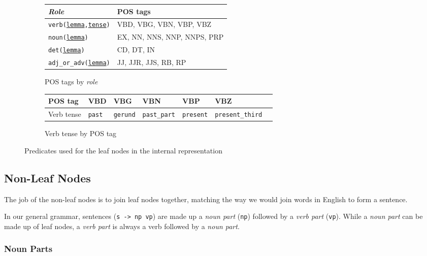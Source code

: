 \begin{figure}[H]
\begin{subfigure}{\textwidth}
\centering
\begin{tabular}{@{}ll@{}}
\toprule
\textit{Role}         & POS tags                    \\ \midrule
\texttt{verb(\underline{lemma},\underline{tense})}         & VBD, VBG, VBN, VBP, VBZ \\
\texttt{noun(\underline{lemma})}         & EX, NN, NNS, NNP, NNPS, PRP \\
\texttt{det(\underline{lemma})}          & CD, DT, IN                  \\
\texttt{adj\_or\_adv(\underline{lemma})} & JJ, JJR, JJS, RB, RP        \\ \bottomrule
\end{tabular}
\caption{POS tags by \textit{role}}
\vspace{\baselineskip}
\end{subfigure}
\begin{subfigure}{\textwidth}
\centering
\begin{tabular}{@{}lllllll@{}}
\toprule
POS tag  & VBD  & VBG    & VBN        & VBP     & VBZ            \\ \midrule
Verb tense & \texttt{past} & \texttt{gerund} & \texttt{past\_part} & \texttt{present} & \texttt{present\_third} \\ \bottomrule
\end{tabular}
\caption{Verb tense by POS tag}
\vspace{\baselineskip}
\end{subfigure}
\caption{Predicates used for the leaf nodes in the internal representation}
\label{fig:leaf_nodes}
\end{figure}

\subsection{Non-Leaf Nodes}

The job of the non-leaf nodes is to join leaf nodes together, matching the way we would join words in English to form a sentence.

In our general grammar, sentences (\texttt{s -> np vp}) are made up a \textit{noun part} (\texttt{np}) followed by a \textit{verb part} (\texttt{vp}). While a \textit{noun part} can be made up of leaf nodes, a \textit{verb part} is always a verb followed by a \textit{noun part}.

\subsubsection{Noun Parts}

